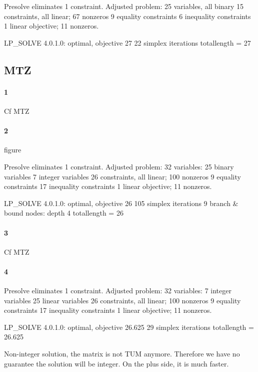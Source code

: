 \documentclass{article}
\begin{document}
Presolve eliminates 1 constraint.
Adjusted problem:
25 variables, all binary
15 constraints, all linear; 67 nonzeros
	9 equality constraints
	6 inequality constraints
1 linear objective; 11 nonzeros.

LP_SOLVE 4.0.1.0: optimal, objective 27
22 simplex iterations
totallength = 27

\subsection{MTZ}

\paragraph{1}

Cf MTZ

\paragraph{2}

figure

Presolve eliminates 1 constraint.
Adjusted problem:
32 variables:
	25 binary variables
	7 integer variables
26 constraints, all linear; 100 nonzeros
	9 equality constraints
	17 inequality constraints
1 linear objective; 11 nonzeros.

LP_SOLVE 4.0.1.0: optimal, objective 26
105 simplex iterations
9 branch \& bound nodes: depth 4
totallength = 26

\paragraph{3}

Cf MTZ

\paragraph{4}

Presolve eliminates 1 constraint.
Adjusted problem:
32 variables:
	7 integer variables
	25 linear variables
26 constraints, all linear; 100 nonzeros
	9 equality constraints
	17 inequality constraints
1 linear objective; 11 nonzeros.

LP_SOLVE 4.0.1.0: optimal, objective 26.625
29 simplex iterations
totallength = 26.625

Non-integer solution, the matrix is not TUM anymore. Therefore we have no guarantee the solution will be integer.
On the plus side, it is much faster.
\end{document}
